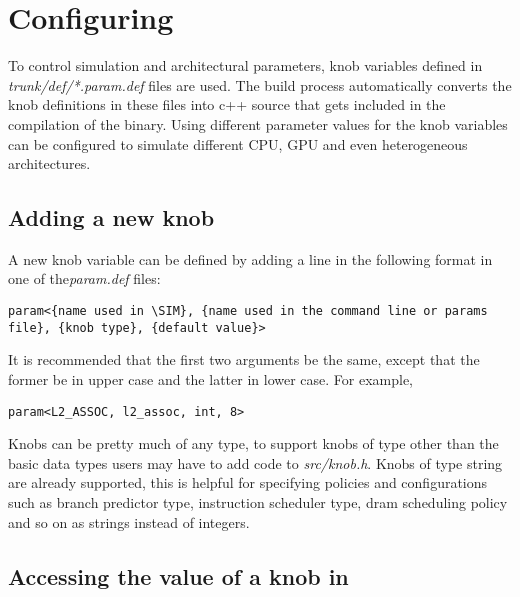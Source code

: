 

\chapter{Configuring \SIM}
\label{sec:knob}


To control simulation and architectural parameters, knob variables defined 
in \textit{trunk/def/*.param.def} files are used. The build process automatically 
converts the knob definitions in these files into c++ source that gets included in 
the compilation of the \SIM binary. Using different parameter values for the knob 
variables \SIM can be configured to simulate different CPU, GPU and even 
heterogeneous architectures. 

\section{Adding a new knob}
\label{sec:knob1}

A new knob variable can be defined by adding a line in the following format in 
one of the\textit{param.def} files:

\begin{Verbatim}
param<{name used in \SIM}, {name used in the command line or params file}, {knob type}, {default value}>
\end{Verbatim}

It is recommended that the first two arguments be the same, except that the
former be in upper case and the latter in lower case. For example,

\begin{Verbatim}
param<L2_ASSOC, l2_assoc, int, 8>
\end{Verbatim}



Knobs can be pretty much of any type, to support knobs of type other than the
basic data types users may have to add code to \textit{src/knob.h}. Knobs of
type string are already supported, this is helpful for specifying policies and
configurations such as branch predictor type, instruction scheduler type, dram
scheduling policy and so on as strings instead of integers.


\section{Accessing the value of a knob in \SIM}

